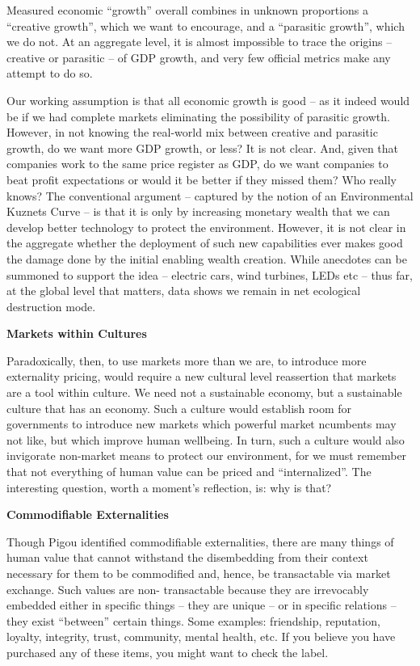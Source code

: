 \documentclass[
]{book}
\begin{document}
Measured economic ``growth'' overall combines in unknown proportions a ``creative
growth'', which we want to encourage, and a ``parasitic growth'', which we do not. At an
aggregate level, it is almost impossible to trace the origins -- creative or parasitic -- of GDP
growth, and very few official metrics make any attempt to do so.

Our working assumption is that all
economic growth is good -- as it indeed would be if we had complete markets eliminating the
possibility of parasitic growth. However, in not knowing the real-world mix between creative
and parasitic growth, do we want more GDP growth, or less? It is not clear. And, given that
companies work to the same price register as GDP, do we want companies to beat profit
expectations or would it be better if they missed them? Who really knows?
The conventional argument -- captured by the notion of an Environmental Kuznets Curve -- is
that it is only by increasing monetary wealth that we can develop better technology to protect
the environment. However, it is not clear in the aggregate whether the deployment of such
new capabilities ever makes good the damage done by the initial enabling wealth creation.
While anecdotes can be summoned to support the idea -- electric cars, wind turbines, LEDs
etc -- thus far, at the global level that matters, data shows we remain in net ecological
destruction mode.

\textbf{Markets within Cultures}

Paradoxically, then, to use markets more than we are, to introduce more externality pricing,
would require a new cultural level reassertion that markets are a tool within culture. We need
not a sustainable economy, but a sustainable culture that has an economy. Such a culture
would establish room for governments to introduce new markets which powerful market
ncumbents may not like, but which improve human wellbeing. In turn, such a culture would
also invigorate non-market means to protect our environment, for we must remember that not
everything of human value can be priced and ``internalized''. The interesting question, worth a
moment's reflection, is: why is that?

\textbf{Commodifiable Externalities}

Though Pigou identified commodifiable externalities, there are many things of human value
that cannot withstand the disembedding from their context necessary for them to be
commodified and, hence, be transactable via market exchange. Such values are non-
transactable because they are irrevocably embedded either in specific things -- they are
unique -- or in specific relations -- they exist ``between'' certain things. Some examples:
friendship, reputation, loyalty, integrity, trust, community, mental health, etc. If you believe you
have purchased any of these items, you might want to check the label.
\end{document}
